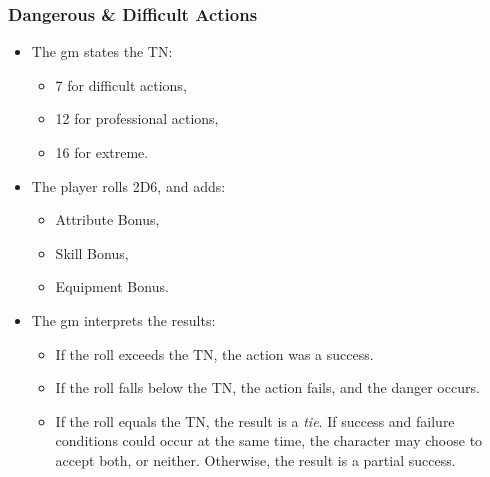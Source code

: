 \subsubsection*{Dangerous \& Difficult Actions}

\begin{itemize}

  \item
  The \gls{gm} states the TN:

  \begin{itemize}
    \item
    7 for difficult actions,
    \item
    12 for professional actions,
    \item
    16 for extreme.
  \end{itemize}
  \item
  The player rolls 2D6, and adds:
  \begin{itemize}
    \item
    Attribute Bonus,
    \item
    Skill Bonus,
    \item
    Equipment Bonus.
  \end{itemize}
  \item
  The \gls{gm} interprets the results:
  \begin{itemize}
    \item
    If the roll exceeds the TN, the action was a success.
    \item
    If the roll falls below the TN, the action fails, and the danger occurs.
    \item
    If the roll equals the TN, the result is a \emph{tie}.
    If success and failure conditions could occur at the same time, the character may choose to accept both, or neither.
    Otherwise, the result is a partial success.
    \end{itemize}

\end{itemize}
